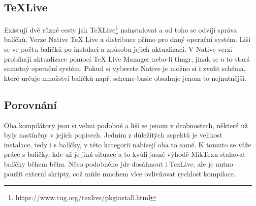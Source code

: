 \subsection{TeXLive}
Existují dvě různé cesty jak TeXLive\footnote{https://www.tug.org/texlive/pkginstall.html} nainstalovat a od toho se odvíjí správa balíčků. Verze Native TeX Live a distribuce přímo pro daný operační systém. Liší se ve počtu balíčků po instalaci a způsobu jejich aktualizací. V Native verzi probíhají aktualizace pomocí TeX Live Manager nebo-li tlmgr, jinak se o to stará samotný operační systém. Pokud si vyberete Native je možno si i zvolit schéma, které určuje množství balíčků např. scheme-basic obsahuje jenom to nejnutnější. 

\subsection{Porovnání}
Oba kompilátory jsou si velmi podobné a liší se jenom v drobnostech, některé už byly nastíněny v jejich popisech. Jedním z důležitých aspektů je velikost instalace, tedy i s balíčky, v této kategorii nabízejí oba to samé. K tomuto se váže práce s balíčky, kde už je jiná situace a to kvůli jasné výhodě MikTexu stahovat balíčky během běhu. Něco podobného jde dosáhnout i TexLive, ale je nutno použít externí skripty, což může mnohem více ovlivňovat rychlost kompilace. 
